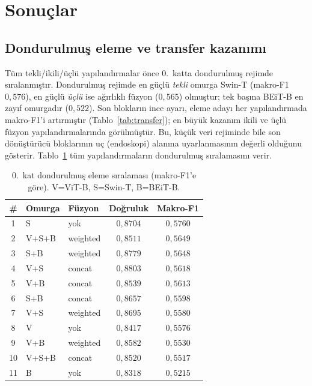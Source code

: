 \section{Sonuçlar}
\label{sec:results}

\subsection{Dondurulmuş eleme ve transfer kazanımı}
Tüm tekli/ikili/üçlü yapılandırmalar önce 0.~katta dondurulmuş rejimde
sıralanmıştır. Dondurulmuş rejimde en güçlü \emph{tekli} omurga Swin-T
(makro-F1 $0{,}576$), en güçlü \emph{üçlü} ise ağırlıklı füzyon ($0{,}565$)
olmuştur; tek başına BEiT-B en zayıf omurgadır ($0{,}522$). Son blokların ince
ayarı, eleme adayı her yapılandırmada makro-F1'i artırmıştır
(Tablo~\ref{tab:transfer}); en büyük kazanım ikili ve üçlü füzyon
yapılandırmalarında görülmüştür. Bu, küçük veri rejiminde bile son dönüştürücü
bloklarının uç (endoskopi) alanına uyarlanmasının değerli olduğunu gösterir.
Tablo~\ref{tab:frozen} tüm yapılandırmaların dondurulmuş sıralamasını verir.

\begin{table}[H]
  \centering
  \caption{0.~kat dondurulmuş eleme sıralaması (makro-F1'e göre).
  V=ViT-B, S=Swin-T, B=BEiT-B.}
  \label{tab:frozen}
  \begin{tabular}{cllcc}
    \toprule
    \# & Omurga & Füzyon & Doğruluk & Makro-F1 \\
    \midrule
    1  & S     & yok      & $0{,}8704$ & $0{,}5760$ \\
    2  & V+S+B & weighted & $0{,}8511$ & $0{,}5649$ \\
    3  & S+B   & weighted & $0{,}8779$ & $0{,}5648$ \\
    4  & V+S   & concat   & $0{,}8803$ & $0{,}5618$ \\
    5  & V+B   & concat   & $0{,}8539$ & $0{,}5613$ \\
    6  & S+B   & concat   & $0{,}8657$ & $0{,}5598$ \\
    7  & V+S   & weighted & $0{,}8695$ & $0{,}5580$ \\
    8  & V     & yok      & $0{,}8417$ & $0{,}5576$ \\
    9  & V+B   & weighted & $0{,}8582$ & $0{,}5530$ \\
    10 & V+S+B & concat   & $0{,}8520$ & $0{,}5517$ \\
    11 & B     & yok      & $0{,}8318$ & $0{,}5215$ \\
    \bottomrule
  \end{tabular}
\end{table}

